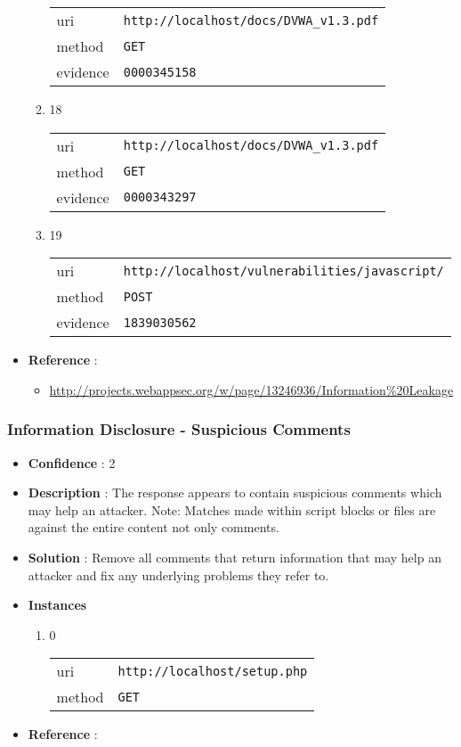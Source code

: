 \documentclass[10pt]{article}
\begin{document}
\begin{itemize}
\begin{enumerate}
\begin{tabular}{| l | p{12cm}}
uri & \texttt{http://localhost/docs/DVWA\_v1.3.pdf} \\
method & \texttt{GET} \\
evidence & \texttt{0000345158} \\
\end{tabular}
\item[] 18
\begin{tabular}{| l | p{12cm}}
uri & \texttt{http://localhost/docs/DVWA\_v1.3.pdf} \\
method & \texttt{GET} \\
evidence & \texttt{0000343297} \\
\end{tabular}
\item[] 19
\begin{tabular}{| l | p{12cm}}
uri & \texttt{http://localhost/vulnerabilities/javascript/} \\
method & \texttt{POST} \\
evidence & \texttt{1839030562} \\
\end{tabular}
\end{enumerate}
\item[] \textbf{Reference} : 
\begin{itemize}
\item \url{http://projects.webappsec.org/w/page/13246936/Information\%20Leakage}
\end{itemize}
\end{itemize}
\subsubsection{Information Disclosure - Suspicious Comments}
\begin{itemize}
\item[] \textbf{Confidence} : 2
\item[] \textbf{Description} : The response appears to contain suspicious comments which may help an attacker. Note: Matches made within script blocks or files are against the entire content not only comments.
\item[] \textbf{Solution} :  Remove all comments that return information that may help an attacker and fix any underlying problems they refer to.
\item[] \textbf{Instances}
\begin{enumerate}
\item[] 0
\begin{tabular}{| l | p{12cm}}
uri & \texttt{http://localhost/setup.php} \\
method & \texttt{GET} \\
\end{tabular}
\end{enumerate}
\item[] \textbf{Reference} : 
\end{itemize}
\end{document}
